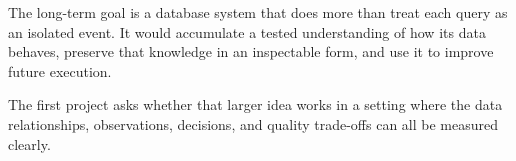 \documentclass[11pt]{article}
\begin{document}
The long-term goal is a database system that does more than treat each query as an isolated event. It would accumulate a tested understanding of how its data behaves, preserve that knowledge in an inspectable form, and use it to improve future execution.

The first project asks whether that larger idea works in a setting where the data relationships, observations, decisions, and quality trade-offs can all be measured clearly.
\end{document}
